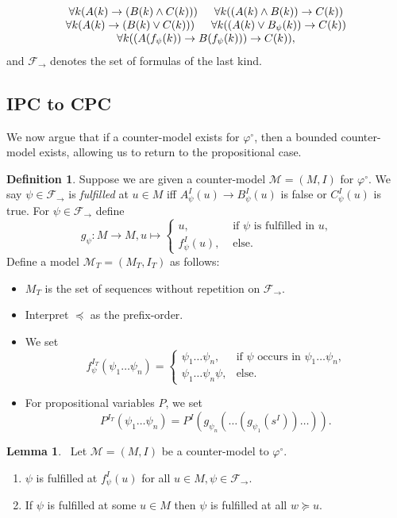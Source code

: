 \documentclass[a4paper,11pt]{report}
\theoremstyle{definition}
\theoremstyle{definition}
\theoremstyle{definition}
\newtheorem{lemma}[theorem]{Lemma}
\theoremstyle{definition}
\theoremstyle{definition}
\newtheorem{definition}[theorem]{Definition}
\theoremstyle{definition}
\theoremstyle{definition}
\begin{document}
	$$\begin{matrix}
		\forall k(A(k)\to (B(k)\wedge C(k)))\indent\forall k((A(k)\wedge B(k))\to C(k))\\
		\forall k(A(k)\to (B(k)\vee C(k)))\indent\forall k((A(k)\vee B_\psi(k))\to C(k))\\
		\forall k((A(f_\psi(k))\to B(f_\psi(k)))\to C(k)),
	\end{matrix}$$
	and $\mathcal F_\to$ denotes the set of formulas of the last kind.

	
	\subsection{IPC to CPC}
	
	We now argue that if a counter-model exists for $\varphi^\circ$, then a bounded counter-model exists, allowing us to return to the propositional case.
	
	\begin{definition}
		Suppose we are given a counter-model $\mathcal M = (M, I)$ for $\varphi^\circ$.
		We say $\psi\in\mathcal F_\to$ is \emph{fulfilled} at $u\in M$ iff $A_\psi^I(u)\to B_\psi^I(u)$ is false or $C_\psi^I(u)$ is true. For $\psi\in\mathcal F_\to$ define $$g_\psi : M\to M, u\mapsto\begin{cases}
			u,&\text{ if $\psi$ is fulfilled in $u$,}\\
			f^I_\psi(u),&\text{ else.}		
		\end{cases}$$Define a model $\mathcal M_T = (M_T, I_T)$ as follows:
		\begin{itemize}
			\item $M_T$ is the set of sequences without repetition on $\mathcal F_\to$.
			\item Interpret $\preceq$ as the prefix-order.
			\item We set $$f_\psi^{I_T}(\psi_1\dots\psi_n) = \begin{cases}
				\psi_1\dots\psi_n, &\text{if $\psi$ occurs in $\psi_1\dots\psi_n$,}\\
				\psi_1\dots\psi_n\psi, &\text{else.}			
			\end{cases}$$
			\item For propositional variables $P$, we set $$P^{I_T}(\psi_1\dots \psi_n) = P^I(g_{\psi_n}(\dots(g_{\psi_1}(s^I))\dots)).$$
		\end{itemize}
	\end{definition}
	\begin{lemma}~\label{thm:prop-countermodel-reduction}
		Let $\mathcal M = (M, I)$ be a counter-model to $\mathcal \varphi^\circ$.
		\begin{enumerate}
			\item $\psi$ is fulfilled at $f_\psi^I(u)$ for all $u\in M, \psi\in\mathcal F_\to$.
			\item If $\psi$ is fulfilled at some $u\in M$ then $\psi$ is fulfilled at all $w\succeq u$.
		\end{enumerate}
	\end{lemma}
	
\end{document}
